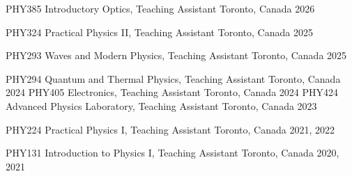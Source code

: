 


\begin{cvhonors}

  \cvhonor
    {PHY385} %
    {Introductory Optics, Teaching Assistant} %
    {Toronto, Canada} %
    {2026} %


  \cvhonor
    {PHY324} %
    {Practical Physics II, Teaching Assistant} %
    {Toronto, Canada} %
    {2025} %

  \cvhonor
    {PHY293} %
    {Waves and Modern Physics, Teaching Assistant} %
    {Toronto, Canada} %
    {2025} %

  \cvhonor
    {PHY294} %
    {Quantum and Thermal Physics, Teaching Assistant} %
    {Toronto, Canada} %
    {2024} %
  \cvhonor
    {PHY405} %
    {Electronics, Teaching Assistant} %
    {Toronto, Canada} %
    {2024} %
  \cvhonor
    {PHY424} %
    {Advanced Physics Laboratory, Teaching Assistant} %
    {Toronto, Canada} %
    {2023} %

  \cvhonor
    {PHY224} %
    {Practical Physics I, Teaching Assistant} %
    {Toronto, Canada} %
    {2021, 2022} %

  \cvhonor
    {PHY131} %
    {Introduction to Physics I, Teaching Assistant} %
    {Toronto, Canada} %
    {2020, 2021} %

\end{cvhonors}
